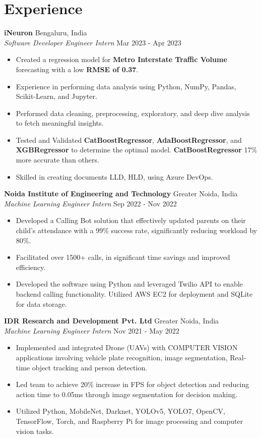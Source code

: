 \documentclass[9pt]{article}
\begin{document}
\section*{Experience}
\textbf{iNeuron} \hfill Bengaluru, India \\
\textit{Software Developer Engineer Intern} \hfill Mar 2023 - Apr 2023
\begin{itemize}
  \item Created a regression model for \textbf{Metro Interstate Traffic Volume} forecasting with a low \textbf{RMSE of 0.37}.
  \item Experience in performing data analysis using Python, NumPy, Pandas, Scikit-Learn, and Jupyter.
  \item Performed data cleaning, preprocessing, exploratory, and deep dive analysis to fetch meaningful insights.
  \item Tested and Validated \textbf{CatBoostRegressor}, \textbf{AdaBoostRegressor}, and \textbf{XGBRegressor} to determine the optimal model. \textbf{CatBoostRegressor} 17\% more accurate than others.
  \item Skilled in creating documents LLD, HLD, using Azure DevOps.
\end{itemize}

\textbf{Noida Institute of Engineering and Technology} \hfill Greater Noida, India \\
\textit{Machine Learning Engineer Intern} \hfill Sep 2022 - Nov 2022
\begin{itemize}
  \item Developed a Calling Bot solution that effectively updated parents on their child’s attendance with a 99\% success rate, significantly reducing workload by 80\%.
  \item Facilitated over 1500+ calls, in significant time savings and improved efficiency.
  \item Developed the software using Python and leveraged Twilio API to enable backend calling functionality. Utilized AWS EC2 for deployment and SQLite for data storage.
\end{itemize}

\textbf{IDR Research and Development Pvt. Ltd} \hfill Greater Noida, India \\
\textit{Machine Learning Engineer Intern} \hfill Nov 2021 - May 2022
\begin{itemize}
  \item Implemented and integrated Drone (UAVs) with COMPUTER VISION applications involving vehicle plate recognition, image segmentation, Real-time object tracking and person detection.
  \item Led team to achieve 20\% increase in FPS for object detection and reducing action time to 0.05ms through image segmentation for decision making.
  \item Utilized Python, MobileNet, Darknet, YOLOv5, YOLO7, OpenCV, TensorFlow, Torch, and Raspberry Pi for image processing and computer vision tasks.
\end{itemize}
\end{document}
